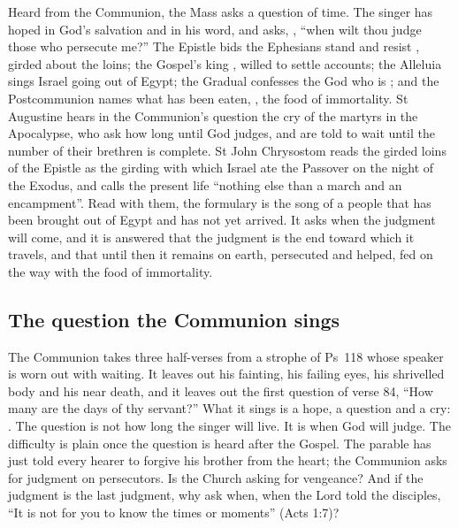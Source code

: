 \label{sec:last-exodus-of-the-church}

Heard from the Communion, the Mass asks a question of time. The singer has hoped
in God's salvation and in his word, and asks, , ``when wilt thou judge those who persecute me?''
The Epistle bids the Ephesians stand and resist , girded about
the loins; the Gospel's king , willed to settle
accounts; the Alleluia sings Israel going out of Egypt; the Gradual confesses
the God who is ; and the Postcommunion
names what has been eaten, , the food of
immortality. St Augustine hears in the Communion's question the cry of the
martyrs in the Apocalypse, who ask how long until God judges, and are told to
wait until the number of their brethren is complete. St John Chrysostom reads
the girded loins of the Epistle as the girding with which Israel ate the
Passover on the night of the Exodus, and calls the present life ``nothing else
than a march and an encampment''. Read with them, the formulary is the song of a
people that has been brought out of Egypt and has not yet arrived. It asks when
the judgment will come, and it is answered that the judgment is the end toward
which it travels, and that until then it remains on earth, persecuted and helped,
fed on the way with the food of immortality.

\subsection{The question the Communion sings}

The Communion takes three half-verses from a strophe of Ps~118 whose speaker is
worn out with waiting. It leaves out his fainting, his failing eyes, his
shrivelled body and his near death, and it leaves out the first question of
verse 84, ``How many are the days of thy servant?'' What it sings is a hope, a
question and a cry: . The question is not how long the singer will live. It is when
God will judge. The difficulty is plain once the question is heard after the
Gospel. The parable has just told every hearer to forgive his brother from the
heart; the Communion asks for judgment on persecutors. Is the Church asking for
vengeance? And if the judgment is the last judgment, why ask when, when the Lord
told the disciples, ``It is not for you to know the times or moments'' (Acts 1:7)?

